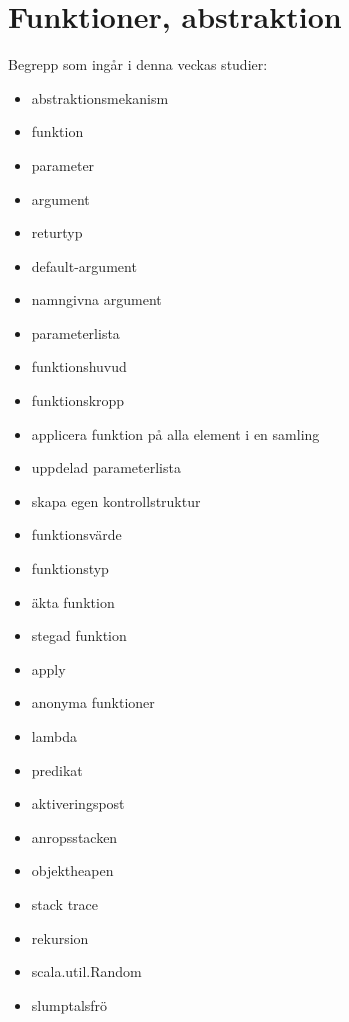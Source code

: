 \chapter{Funktioner, abstraktion}\label{chapter:W03}
Begrepp som ingår i denna veckas studier:
\begin{itemize}[noitemsep,label={$\square$},leftmargin=*]
\item abstraktionsmekanism
\item funktion
\item parameter
\item argument
\item returtyp
\item default-argument
\item namngivna argument
\item parameterlista
\item funktionshuvud
\item funktionskropp
\item applicera funktion på alla element i en samling
\item uppdelad parameterlista
\item skapa egen kontrollstruktur
\item funktionsvärde
\item funktionstyp
\item äkta funktion
\item stegad funktion
\item apply
\item anonyma funktioner
\item lambda
\item predikat
\item aktiveringspost
\item anropsstacken
\item objektheapen
\item stack trace
\item rekursion
\item scala.util.Random
\item slumptalsfrö\end{itemize}
